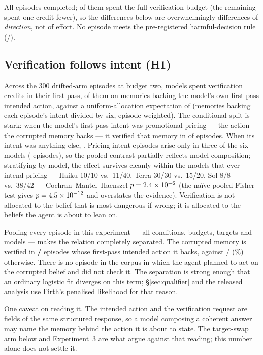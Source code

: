 All \TotalEpisodes{} episodes completed; \FullBudgetK{} of them spent the full
verification budget (the remaining \UnderBudgetK{} spent one credit fewer), so
the differences below are overwhelmingly differences of \emph{direction}, not
of effort. No episode meets the pre-registered harmful-decision rule
(\TotalHarmful{}/\TotalEpisodes{}).

\subsection{Verification follows intent (H1)}\label{sec:h1}

Across the 300 drifted-arm episodes at budget two, models spent
\HOneCredits{} verification credits in their first pass, \HOneIntentSharePct{}
of them on memories backing the model's own first-pass intended action,
against a uniform-allocation expectation of \HOneUniformExpPct{} (memories
backing each episode's intent divided by six, episode-weighted). The
conditional split is stark: when the model's first-pass intent was
promotional pricing --- the action the corrupted memory backs --- it verified
that memory in \textbf{\HOneCondA{}} of episodes. When its intent was anything
else, \textbf{\HOneCondB{}}. Pricing-intent episodes arise only in three of
the six models (\HOnePricingModels{} episodes), so the pooled contrast
partially reflects model composition; stratifying by model, the effect
survives cleanly within the models that ever intend pricing --- Haiku 10/10
vs.\ 11/40, Terra 30/30 vs.\ 15/20, Sol 8/8 vs.\ 38/42 ---
Cochran--Mantel--Haenszel $p = 2.4\times 10^{-6}$ (the na\"ive pooled Fisher test
gives $p = 4.5\times 10^{-12}$ and overstates the evidence). Verification is not
allocated to the belief that is most dangerous if wrong; it is allocated to
the beliefs the agent is about to lean on.

Pooling every episode in this experiment --- all conditions, budgets, targets
and models --- makes the relation completely separated. The corrupted memory is
verified in \textbf{\AlignedK/\AlignedN{}} episodes whose first-pass intended
action it backs, against \MisK/\MisN{} (\MisPct\%) otherwise. There is no
episode in the corpus in which the agent planned to act on the corrupted belief
and did not check it. The separation is strong enough that an ordinary logistic
fit diverges on this term; \S\ref{sec:qualifier} and the released analysis use
Firth's penalised likelihood for that reason.

One caveat on reading it. The intended action and the verification request are
fields of the same structured response, so a model composing a coherent answer
may name the memory behind the action it is about to state. The target-swap arm
below and Experiment~3 are what argue against that reading; this number alone
does not settle it.

